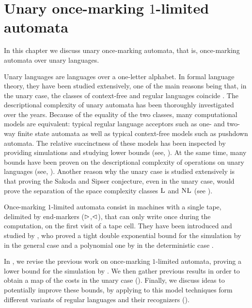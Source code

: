 \chapter{Unary once-marking \texorpdfstring{$1$}{1}-limited automata}\label{ch:oncemarking}
In this chapter we discuss unary once-marking automata, that is, once-marking automata over unary languages.

Unary languages are languages over a one-letter alphabet.
In formal language theory, they have been studied extensively, one of the main reasons being that, in the unary case, the classes of context-free and regular languages coincide \cite{GinRic62}.
The descriptional complexity of unary automata has been thoroughly investigated over the years.
Because of the equality of the two classes, many computational models are equivalent: typical regular language acceptors such as one- and two-way finite state automata as well as typical context-free models such as pushdown automata.
The relative succinctness of these models has been inspected by providing simulations and studying lower bounds (see, \eg[,] \cite{GefMer+03,MerPig01,Pig08,PigSha+02}).
At the same time, many bounds have been proven on the descriptional complexity of operations on unary languages (see, \eg[,] \cite{HolKut03,KunOkh12,MerPig05,PigSha02}).
Another reason why the unary case is studied extensively is that proving the Sakoda and Sipser conjecture, even in the unary case, would prove the separation of the space complexity classes $\textsc{L}$ and $\textsc{NL}$ (see ).

Once-marking $1$-limited automata consist in machines with a single tape, delimited by end-markers ($\rhd$,$\lhd$), that can only write once during the computation, on the first visit of a tape cell.
They have been introduced and studied by \citeauthor{PigPri23a}, who proved a tight double exponential bound for the simulation by \ODFAs in the general case and a polynomial one by \TDFA in the deterministic case \cite{PigPri23a}.

In , we revise the previous work on once-marking $1$-limited automata, proving a lower bound for the simulation by \ONFA.
We then gather previous results in order to obtain a map of the costs in the unary case ().
Finally, we discuss ideas to potentially improve these bounds, by applying to this model techniques form different variants of regular languages and their recognizers ().



